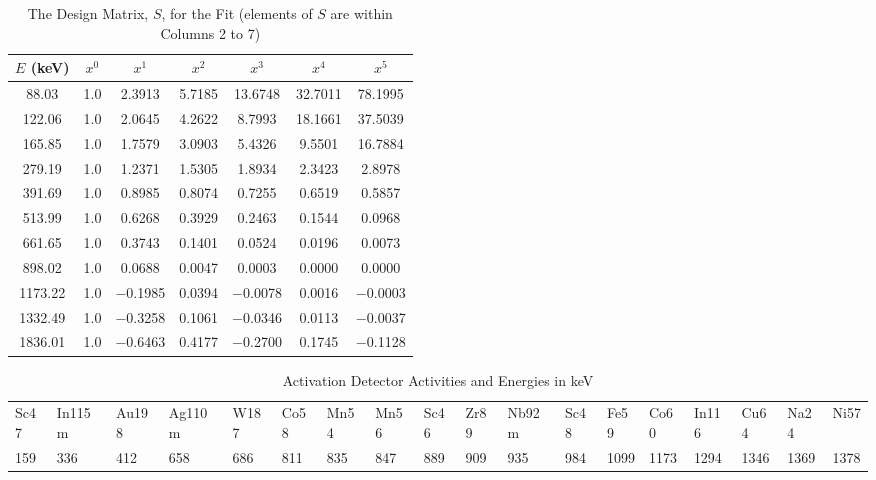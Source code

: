 \documentclass[12pt]{article}
\begin{document}
\begin{table}[ht]
\centering
\caption{The Design Matrix, $S$, for the Fit (elements of $S$ are within Columns 2 to 7)}
\label{tab:A1.2}
\begin{tabular}{ccccccc}
\toprule
$E$ (keV) & $x^0$ & $x^1$ & $x^2$ & $x^3$ & $x^4$ & $x^5$ \\
\midrule
88.03   & 1.0 & 2.3913  & 5.7185  & 13.6748  & 32.7011 & 78.1995  \\
122.06  & 1.0 & 2.0645  & 4.2622  &  8.7993  & 18.1661 & 37.5039  \\
165.85  & 1.0 & 1.7579  & 3.0903  &  5.4326  &  9.5501 & 16.7884  \\
279.19  & 1.0 & 1.2371  & 1.5305  &  1.8934  &  2.3423 &  2.8978  \\
391.69  & 1.0 & 0.8985  & 0.8074  &  0.7255  &  0.6519 &  0.5857  \\
513.99  & 1.0 & 0.6268  & 0.3929  &  0.2463  &  0.1544 &  0.0968  \\
661.65  & 1.0 & 0.3743  & 0.1401  &  0.0524  &  0.0196 &  0.0073  \\
898.02  & 1.0 & 0.0688  & 0.0047  &  0.0003  &  0.0000 &  0.0000  \\
1173.22 & 1.0 & $-$0.1985 & 0.0394 & $-$0.0078 & 0.0016 & $-$0.0003 \\
1332.49 & 1.0 & $-$0.3258 & 0.1061 & $-$0.0346 & 0.0113 & $-$0.0037 \\
1836.01 & 1.0 & $-$0.6463 & 0.4177 & $-$0.2700 & 0.1745 & $-$0.1128 \\
\bottomrule
\end{tabular}
\end{table}

\begin{table}[ht]
\centering
\caption{Activation Detector Activities and Energies in keV}
\label{tab:A1.3}
\small
\begin{tabular}{llllllllllllllllll}
\toprule
Sc47 & In115m & Au198 & Ag110m & W187 & Co58 & Mn54 & Mn56 & Sc46 & Zr89 & Nb92m & Sc48 & Fe59 & Co60 & In116 & Cu64 & Na24 & Ni57 \\
159 & 336 & 412 & 658 & 686 & 811 & 835 & 847 & 889 & 909 & 935 & 984 & 1099 & 1173 & 1294 & 1346 & 1369 & 1378 \\
\bottomrule
\end{tabular}
\end{table}
\end{document}
